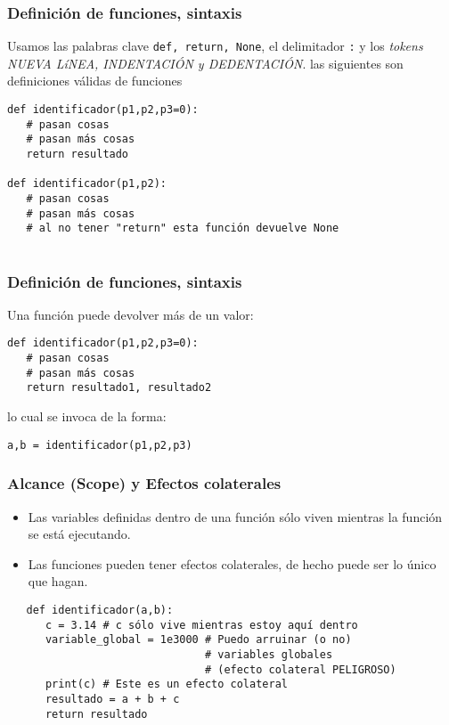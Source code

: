\documentclass{beamer}
\begin{document}
\begin{frame}[fragile]
\frametitle{Definición de funciones, sintaxis}
Usamos las palabras clave \texttt{def, return, None}, el delimitador \texttt{:} y los {\em tokens NUEVA LíNEA, INDENTACIÓN y DEDENTACIÓN}. las siguientes son definiciones válidas de funciones
\begin{block}{}
\begin{verbatim}
def identificador(p1,p2,p3=0):
   # pasan cosas
   # pasan más cosas
   return resultado 
 
def identificador(p1,p2):
   # pasan cosas
   # pasan más cosas
   # al no tener "return" esta función devuelve None
   
\end{verbatim}
\end{block}
\end{frame}

\begin{frame}[fragile]
\frametitle{Definición de funciones, sintaxis}
Una función puede devolver más de un valor:
\begin{block}{}
\begin{verbatim}
def identificador(p1,p2,p3=0):
   # pasan cosas
   # pasan más cosas
   return resultado1, resultado2    
\end{verbatim}
lo cual se invoca de la forma:
\begin{verbatim}
a,b = identificador(p1,p2,p3)
\end{verbatim}
\end{block}
\end{frame}

\begin{frame}[fragile]
   \frametitle{Alcance (Scope) y Efectos colaterales}
   \begin{itemize}
      \item Las variables definidas dentro de una función sólo viven mientras la función se está ejecutando.
      \item Las funciones pueden tener efectos colaterales, de hecho puede ser lo único que hagan.
   \end{itemize}
    
   \begin{block}{}
   \begin{verbatim}
   def identificador(a,b):
      c = 3.14 # c sólo vive mientras estoy aquí dentro
      variable_global = 1e3000 # Puedo arruinar (o no) 
                               # variables globales
                               # (efecto colateral PELIGROSO)
      print(c) # Este es un efecto colateral 
      resultado = a + b + c
      return resultado 
   \end{verbatim}
   \end{block}
   \end{frame}
\end{document}
